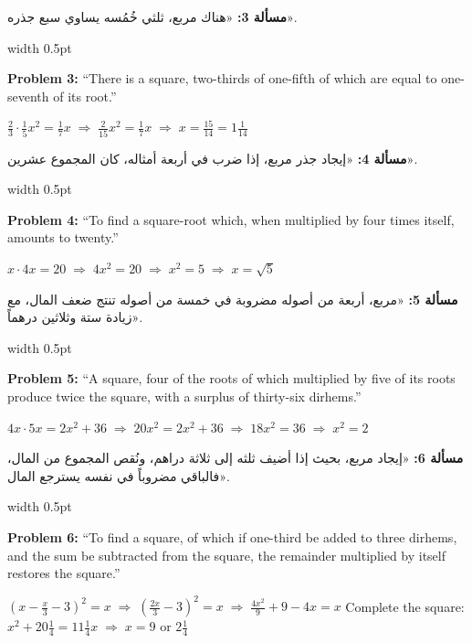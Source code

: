 \documentclass[10pt,a4paper]{book}
\newlength{\colwidth}
\newcommand{\bilingualpair}[2]{%
  \noindent
  \begin{minipage}[t]{\colwidth}
  \begin{flushright}
  \vspace{0pt}
  {\arabicfont\small #1}
  \end{flushright}
  \end{minipage}%
  \hfill\textcolor{columnsepclr}{\vrule width 0.5pt}\hfill
  \begin{minipage}[t]{\colwidth}
  \vspace{0pt}
  {\small #2}
  \end{minipage}%
  \par\vspace{0.6em}
}
\begin{document}
\bilingualpair{
\textbf{مسألة 3:} «هناك مربع، ثلثي خُمُسه يساوي سبع جذره».
}{
\textbf{Problem 3:} ``There is a square, two-thirds of one-fifth of which are
equal to one-seventh of its root.''
}

\begin{mathbox}
$\tfrac{2}{3} \cdot \tfrac{1}{5} x^2 = \tfrac{1}{7}x \;\Rightarrow\; \tfrac{2}{15}x^2 = \tfrac{1}{7}x
\;\Rightarrow\; x = \tfrac{15}{14} = 1\tfrac{1}{14}$
\end{mathbox}

\bilingualpair{
\textbf{مسألة 4:} «إيجاد جذر مربع، إذا ضرب في أربعة أمثاله،
كان المجموع عشرين».
}{
\textbf{Problem 4:} ``To find a square-root which, when multiplied by
four times itself, amounts to twenty.''
}

\begin{mathbox}
$x \cdot 4x = 20 \;\Rightarrow\; 4x^2 = 20 \;\Rightarrow\; x^2 = 5 \;\Rightarrow\; x = \sqrt{5}$
\end{mathbox}

\bilingualpair{
\textbf{مسألة 5:} «مربع، أربعة من أصوله مضروبة في خمسة من
أصوله تنتج ضعف المال، مع زيادة ستة وثلاثين درهماً».
}{
\textbf{Problem 5:} ``A square, four of the roots of which multiplied by
five of its roots produce twice the square, with a surplus of thirty-six
dirhems.''
}

\begin{mathbox}
$4x \cdot 5x = 2x^2 + 36 \;\Rightarrow\; 20x^2 = 2x^2 + 36 \;\Rightarrow\; 18x^2 = 36 \;\Rightarrow\; x^2 = 2$
\end{mathbox}

\bilingualpair{
\textbf{مسألة 6:} «إيجاد مربع، بحيث إذا أضيف ثلثه إلى ثلاثة
دراهم، ونُقص المجموع من المال، فالباقي مضروباً في نفسه
يسترجع المال».
}{
\textbf{Problem 6:} ``To find a square, of which if one-third be added to
three dirhems, and the sum be subtracted from the square, the remainder
multiplied by itself restores the square.''
}

\begin{mathbox}
$\left(x - \tfrac{x}{3} - 3\right)^2 = x \;\Rightarrow\; \left(\tfrac{2x}{3} - 3\right)^2 = x
\;\Rightarrow\; \tfrac{4x^2}{9} + 9 - 4x = x$
Complete the square: $x^2 + 20\tfrac{1}{4} = 11\tfrac{1}{4}x \;\Rightarrow\; x = 9 \text{ or } 2\tfrac{1}{4}$
\end{mathbox}

\newpage


\end{document}

